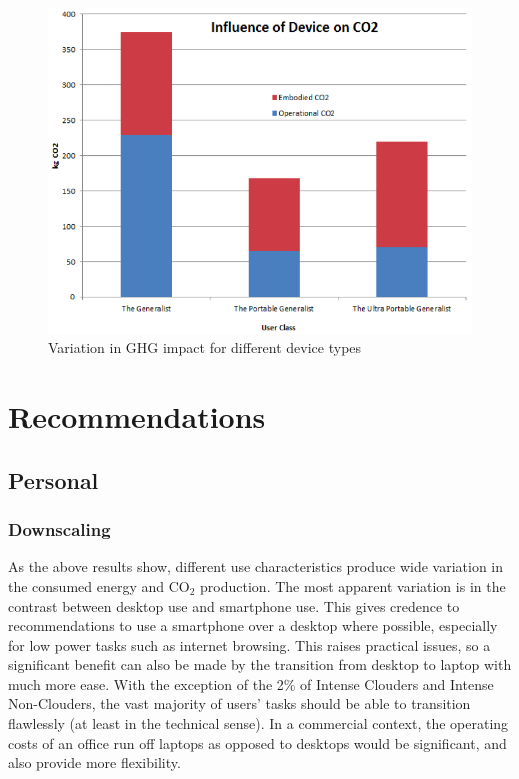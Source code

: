 \documentclass[conference]{IEEEtran}
\begin{document}
\begin{figure}
\centering
\includegraphics[width=0.8\columnwidth]{images/ghgimpact_devicetypes.png}
\caption{Variation in GHG impact for different device types}
\label{fig:ghgimpact_devicetype} 
\end{figure}

\section{Recommendations}

\subsection{Personal}

\subsubsection{Downscaling}

As the above results show, different use characteristics produce wide
variation in the consumed energy and CO$_2$ production. The most
apparent variation is in the contrast between desktop use and
smartphone use. This gives credence to recommendations to use a
smartphone over a desktop where possible, especially for low power
tasks such as internet browsing. This raises practical issues, so a
significant benefit can also be made by the transition from desktop to
laptop with much more ease. With the exception of the 2\% of Intense
Clouders and Intense Non-Clouders, the vast majority of users' tasks
should be able to transition flawlessly (at least in the technical
sense).
In a commercial context, the operating costs of an office run off
laptops as opposed to desktops would be significant, and also provide
more flexibility.
\end{document}
